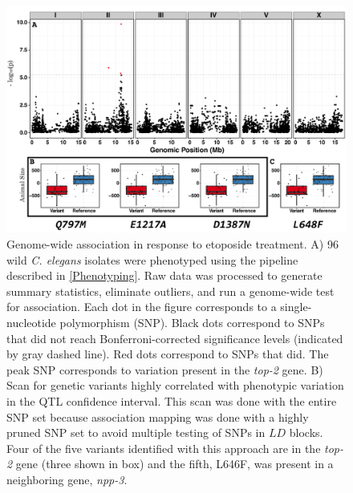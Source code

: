 \documentclass[12pt]{article}
\begin{document}
\begin{figure}[h]
\renewcommand{\thefigure}{A.\arabic{figure}}
\centering
\includegraphics[scale=0.45]{Figures/Appendix_GWAS.pdf}
\vspace{10pt}
\caption[Genome-wide association in response to etoposide]{Genome-wide association in response to etoposide treatment. A) 96 wild {\it C. elegans} isolates were phenotyped using the pipeline described in \autoref{Phenotyping}. Raw data was processed to generate summary statistics, eliminate outliers, and run a genome-wide test for association. Each dot in the figure corresponds to a single-nucleotide polymorphism (SNP). Black dots correspond to SNPs that did not reach Bonferroni-corrected significance levels (indicated by gray dashed line). Red dots correspond to SNPs that did. The peak SNP corresponds to variation present in the {\it top-2} gene. B) Scan for genetic variants highly correlated with phenotypic variation in the QTL confidence interval. This scan was done with the entire SNP set because association mapping was done with a highly pruned SNP set to avoid multiple testing of SNPs in $LD$ blocks. Four of the five variants identified with this approach are in the {\it top-2} gene (three shown in box) and the fifth, L646F, was present in a neighboring gene, {\it npp-3}.}
\label{GWAS}
\end{figure}

\newpage
\end{document}
